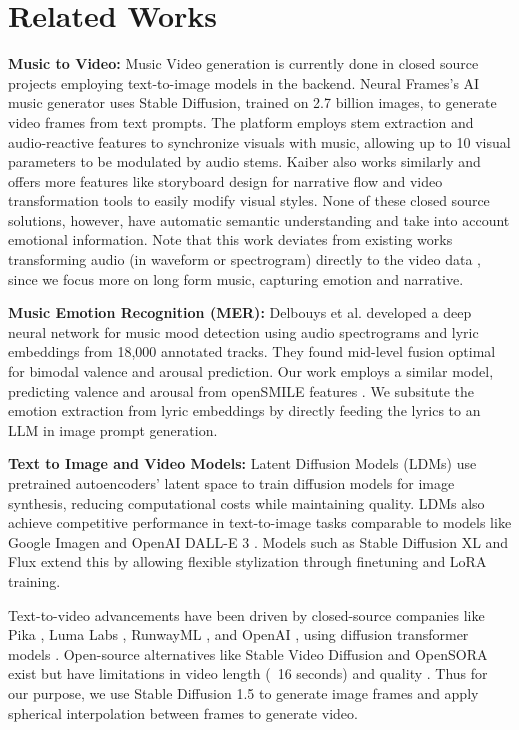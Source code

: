 \section{Related Works}
\textbf{Music to Video:} Music Video generation is currently done in closed source projects employing text-to-image models in the backend. Neural Frames's AI music generator \cite{neuralframes2023} uses Stable Diffusion, trained on 2.7 billion images, to generate video frames from text prompts. The platform employs stem extraction and audio-reactive features to synchronize visuals with music, allowing up to 10 visual parameters to be modulated by audio stems. Kaiber \cite{kaiber2023} also works similarly and offers more features like storyboard design for narrative flow and video transformation tools to easily modify visual styles. None of these closed source solutions, however, have automatic semantic understanding and take into account emotional information. Note that this work deviates from existing works transforming audio (in waveform or spectrogram) directly to the video data \cite{av1, av2, av3}, since we focus more on long form music, capturing emotion and narrative.

\textbf{Music Emotion Recognition (MER):} Delbouys et al. \cite{delbouys2018music} developed a deep neural network for music mood detection using audio spectrograms and lyric embeddings from 18,000 annotated tracks. They found mid-level fusion optimal for bimodal valence and arousal prediction. Our work employs a similar model, predicting valence and arousal from openSMILE features \cite{opensmile}. We subsitute the emotion extraction from lyric embeddings by directly feeding the lyrics to an LLM in image prompt generation.

\textbf{Text to Image and Video Models:} Latent Diffusion Models (LDMs) \cite{stablediff} use pretrained autoencoders' latent space to train diffusion models for image synthesis, reducing computational costs while maintaining quality. LDMs also achieve competitive performance in text-to-image tasks comparable to models like Google Imagen \cite{imagen} and OpenAI DALL-E 3 \cite{dalle}. Models such as Stable Diffusion XL \cite{SDXL} and Flux \cite{flux} extend this by allowing flexible stylization through finetuning and LoRA training. 

Text-to-video advancements have been driven by closed-source companies like Pika \cite{pika}, Luma Labs \cite{dreammachine}, RunwayML \cite{gen3alpha}, and OpenAI \cite{sora}, using diffusion transformer models \cite{dit}. Open-source alternatives like Stable Video Diffusion \cite{svd} and OpenSORA \cite{opensora} exist but have limitations in video length (~16 seconds) and quality \cite{opensora}. Thus for our purpose, we use Stable Diffusion 1.5 to generate image frames and apply spherical interpolation between frames to generate video.


